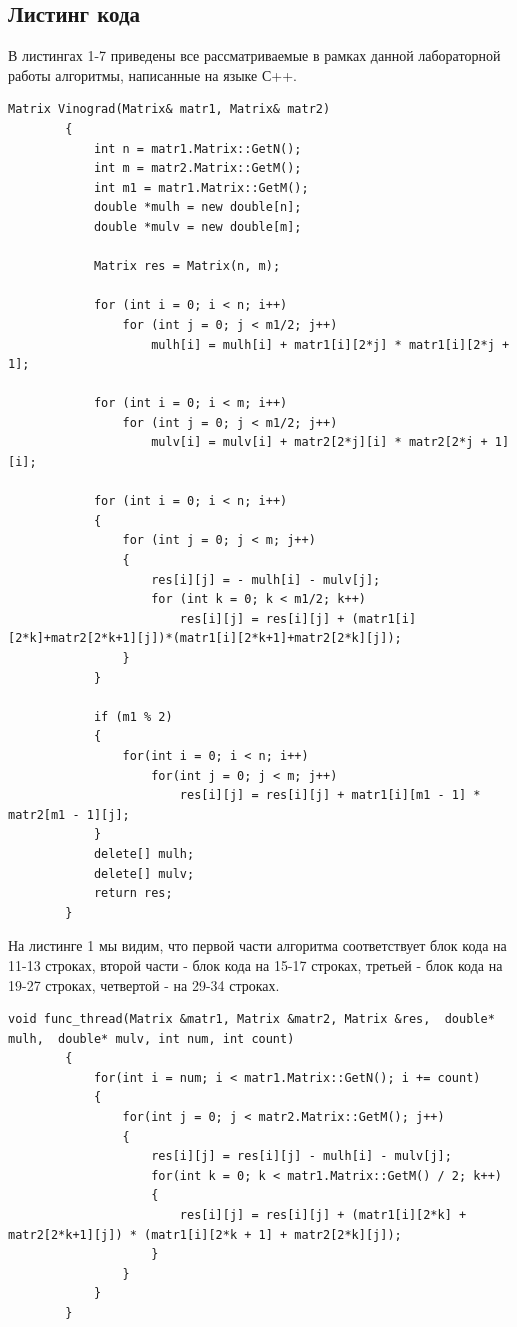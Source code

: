 \documentclass[a4paper, 14pt]{article}
\begin{document}
        \subsection{Листинг кода}
        В листингах 1-7 приведены все рассматриваемые в рамках данной лабораторной работы алгоритмы, написанные на языке С++.
        \newpage
		\begin{lstlisting}[label=some-code,caption=Алгоритм Винограда]
		Matrix Vinograd(Matrix& matr1, Matrix& matr2)
		{
			int n = matr1.Matrix::GetN();
			int m = matr2.Matrix::GetM();
			int m1 = matr1.Matrix::GetM();
			double *mulh = new double[n];
			double *mulv = new double[m];

			Matrix res = Matrix(n, m);

			for (int i = 0; i < n; i++)
				for (int j = 0; j < m1/2; j++)
					mulh[i] = mulh[i] + matr1[i][2*j] * matr1[i][2*j + 1];

			for (int i = 0; i < m; i++)
				for (int j = 0; j < m1/2; j++)
					mulv[i] = mulv[i] + matr2[2*j][i] * matr2[2*j + 1][i];

			for (int i = 0; i < n; i++)
			{
				for (int j = 0; j < m; j++)
				{
					res[i][j] = - mulh[i] - mulv[j];
					for (int k = 0; k < m1/2; k++)
						res[i][j] = res[i][j] + (matr1[i][2*k]+matr2[2*k+1][j])*(matr1[i][2*k+1]+matr2[2*k][j]);
				}
			}

			if (m1 % 2)
			{
				for(int i = 0; i < n; i++)
					for(int j = 0; j < m; j++)
						res[i][j] = res[i][j] + matr1[i][m1 - 1] * matr2[m1 - 1][j];
			}
			delete[] mulh;
			delete[] mulv;
			return res;
		}
		\end{lstlisting}
		
		На листинге 1 мы видим, что первой части алгоритма соответствует блок кода на 11-13 строках, второй части - блок кода на 15-17 строках, третьей - блок кода на 19-27 строках, четвертой - на 29-34 строках.
		
		\begin{lstlisting}[label=some-code,caption=Этап 3(тройной цикл) в алгоритме Винограда]
		void func_thread(Matrix &matr1, Matrix &matr2, Matrix &res,  double* mulh,  double* mulv, int num, int count)
		{
			for(int i = num; i < matr1.Matrix::GetN(); i += count)
			{
				for(int j = 0; j < matr2.Matrix::GetM(); j++)
				{
					res[i][j] = res[i][j] - mulh[i] - mulv[j];
					for(int k = 0; k < matr1.Matrix::GetM() / 2; k++)
					{
						res[i][j] = res[i][j] + (matr1[i][2*k] + matr2[2*k+1][j]) * (matr1[i][2*k + 1] + matr2[2*k][j]);
					}
				}
			}
		}
		\end{lstlisting}
\end{document}

